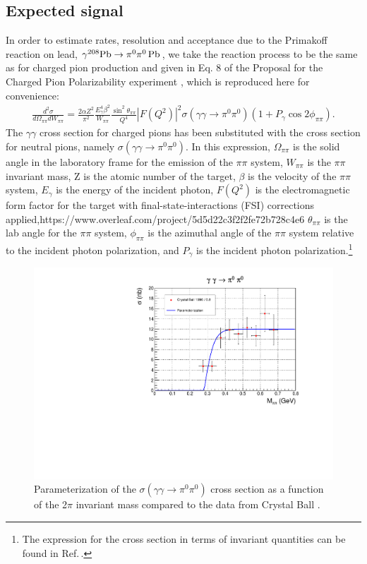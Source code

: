 \subsection{Expected signal}
In order to estimate rates, resolution and acceptance due to the
Primakoff reaction on lead, $\gamma ^{208}\rm{Pb}\rightarrow \pi^0
\pi^0\, \rm{Pb}$, we take the reaction process to be the same as for
charged pion production and given in Eq. 8 of the Proposal for the
Charged Pion Polarizability experiment \cite{CPPexp}, which is
reproduced here for convenience:
\begin{eqnarray}
\frac{d^2\sigma}{d\Omega_{\pi\pi}dW_{\pi\pi}} = \frac{2\alpha Z^2}{\pi^2} \frac{E^4_\gamma \beta^2}{W_{\pi\pi}} \frac{\sin^2\theta_{\pi\pi}}{Q^4} |F(Q^2)|^2 \sigma(\gamma\gamma\rightarrow\pi^0\pi^0) (1+P_\gamma \cos{2\phi_{\pi\pi}}).   \label{eq:PrimakoffSignal}
\end{eqnarray}
The $\gamma\gamma$ cross section for charged pions has been
substituted with the cross section for neutral pions, namely
$\sigma(\gamma\gamma\rightarrow\pi^0\pi^0)$. In this expression,
$\Omega_{\pi\pi}$ is the solid angle in the laboratory frame for the
emission of the $\pi\pi$ system, $W_{\pi\pi}$ is the $\pi\pi$
invariant mass, Z is the atomic number of the target, $\beta$ is the
velocity of the $\pi\pi$ system, $E_\gamma$ is the energy of the
incident photon, $F(Q^2)$ is the electromagnetic form factor for the
target with final-state-interactions (FSI) corrections applied,https://www.overleaf.com/project/5d5d22c3f2f2fe72b728c4e6
$\theta_{\pi\pi}$ is the lab angle for the $\pi\pi$ system,
$\phi_{\pi\pi}$ is the azimuthal angle of the $\pi\pi$ system relative
to the incident photon polarization, and $P_\gamma$ is the incident
photon polarization.\footnote{The expression for the cross section in
  terms of invariant quantities can be found in
  Ref.\,\cite{hdnote3186}.}
\begin{figure}[tph]
\centering
\includegraphics[page=1,width=4.75in]{figures/sigma_2pi0_figs.pdf}
\caption{Parameterization of the $\sigma(\gamma\gamma\rightarrow \pi^0\pi^0)$ cross section as a function
of the 2$\pi$ invariant mass compared to the data from Crystal Ball \cite{Marsiske:1990hx}.
\label{fig:sigma_2pi0_figs_1}}
\end{figure}

